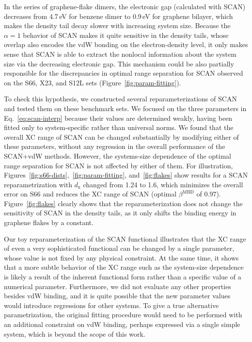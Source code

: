 In the series of graphene-flake dimers, the electronic gap (calculated with SCAN) decreases from 4.7\,eV for benzene dimer to 0.9\,eV for graphene bilayer, which makes the density tail decay slower with increasing system size.
Because the $\alpha=1$ behavior of SCAN makes it quite sensitive in the density tails, whose overlap also encodes the vdW bonding on the electron-density level, it only makes sense that SCAN is able to extract the nonlocal information about the system size via the decreasing electronic gap.
This mechanism could be also partially responsible for the discrepancies in optimal range separation for SCAN observed on the S66, X23, and S12L sets (Figure~\ref{fig:param-fitting}).

To check this hypothesis, we constructed several reparameterizations of SCAN and tested them on these benchmark sets.
We focused on the three parameters in Eq.~\ref{eq:scan-interp} because their values are determined weakly, having been fitted only to system-specific rather than universal norms.
We found that the overall XC range of SCAN can be changed substantially by modifying either of these parameters, without any regression in the overall performance of the SCAN+vdW methods.
However, the systems-size dependence of the optimal range separation for SCAN is not affected by either of them.
For illustration, Figures~\ref{fig:s66-dists},~\ref{fig:param-fitting}, and~\ref{fig:flakes} show results for a SCAN reparametrization with $d_\mathrm x$ changed from 1.24 to 1.6, which minimizes the overall error on S66 and reduces the XC range of SCAN (optimal $\beta^\text{MBD}$ of 0.97).
Figure~\ref{fig:flakes} clearly shows that the reparameterization does not change the sensitivity of SCAN in the density tails, as it only shifts the binding energy in graphene flakes by a constant.

Our toy reparameterization of the SCAN functional illustrates that the XC range of even a very sophisticated functional can be changed by a single parameter, whose value is not fixed by any physical constraint.
At the same time, it shows that a more subtle behavior of the XC range such as the system-size dependence is likely a result of the inherent functional form rather than a specific value of a numerical parameter.
Furthermore, we did not evaluate any other properties besides vdW binding, and it is quite possible that the new parameter values would introduce regressions for other systems.
To give a true alternative parametrization, the original fitting procedure would need to be performed with an additional constraint on vdW binding, perhaps expressed via a single simple system, which is beyond the scope of this work.
